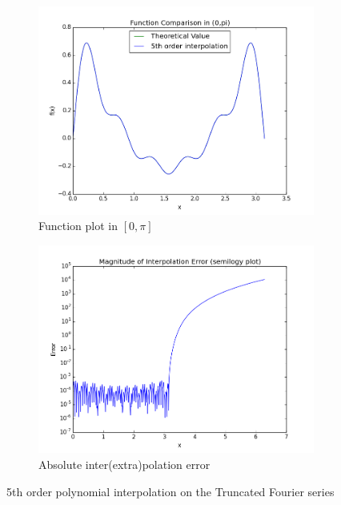 \documentclass[11pt]{article}
\begin{document}
\begin{figure}
        \centering
        \begin{subfigure}{.5\textwidth}
  \centering
        \includegraphics[width=\linewidth]{q5/interpol.png}
                \caption{Function plot in $[0,\pi]$}
                \label{fig:q5_interpol}
                \end{subfigure}%
\begin{subfigure}{.5\textwidth}
  \centering
        \includegraphics[width=\linewidth]{q5/error.png}
                \caption{Absolute inter(extra)polation error}
                \label{fig:q5_error}
	\end{subfigure}
            
\caption{5th order polynomial interpolation on the Truncated Fourier series}
\label{fig:q5}            
\end{figure}
\end{document}
